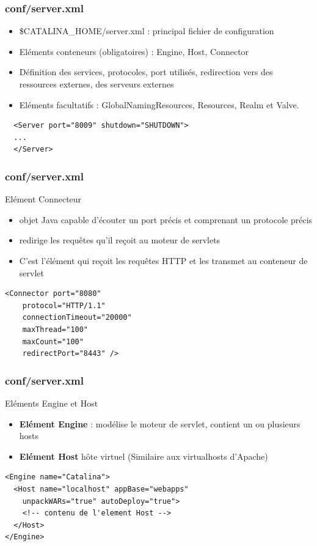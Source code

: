 \begin{frame}[fragile]
  \frametitle{conf/server.xml}

\begin{itemize}
  \item \$CATALINA\_HOME/server.xml : principal fichier de configuration
  \item Eléments conteneurs (obligatoires) : Engine, Host, Connector
  \item Définition des services, protocoles, port utilisés, redirection vers des ressources externes, des serveurs externes
  \item Eléments facultatifs : GlobalNamingResources, Resources, Realm et Valve.
\end{itemize} 

\begin{lstlisting}
  <Server port="8009" shutdown="SHUTDOWN">
  ...
  </Server>
\end{lstlisting}
		
\end{frame}


\begin{frame}[fragile]
  \frametitle{conf/server.xml}
		Elément Connecteur
		\begin{itemize} 
   		\item objet Java capable d'écouter un port précis et comprenant un protocole précis
    	\item redirige les requêtes qu'il reçoit au moteur de servlets
      \item C'est l'élément qui reçoit les requêtes HTTP et les transmet au conteneur de servlet
		\end{itemize}

        \begin{lstlisting}
<Connector port="8080"
    protocol="HTTP/1.1"
    connectionTimeout="20000"
    maxThread="100"
    maxCount="100"
    redirectPort="8443" />
        \end{lstlisting}
\end{frame}

\begin{frame}[fragile]
    \frametitle{conf/server.xml}
		Eléments Engine et Host
		\begin{itemize}
   		\item \textbf{Elément Engine} : modélise le moteur de servlet, contient un ou plusieurs hosts
    	\item \textbf{Elément Host} hôte virtuel (Similaire aux virtualhosts d'Apache)
		\end{itemize}

        \begin{lstlisting}
<Engine name="Catalina">
  <Host name="localhost" appBase="webapps"
    unpackWARs="true" autoDeploy="true">
    <!-- contenu de l'element Host -->
  </Host>
</Engine>
        \end{lstlisting}
\end{frame}

